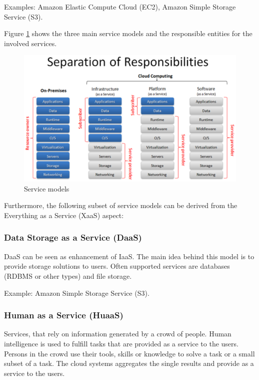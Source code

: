 Examples: Amazon Elastic Compute Cloud (EC2), Amazon Simple Storage Service (S3)\cite{trustedcloudcomputing}.

Figure \ref{fig:cloud_stack} shows the three main service models and the responsible entities for the involved services.

\begin{figure}[h]
	\centering
		\includegraphics{graphics/service_models.eps}
	\caption{Service models\cite{trustedcloudcomputing}}
	\label{fig:cloud_stack}
\end{figure}



Furthermore, the following subset of service models can be derived from the Everything as a Service (XaaS) aspect:

\subsubsection{Data Storage as a Service (DaaS)}
DaaS can be seen as enhancement of IaaS. The main idea behind this model is to provide storage solutions to users. Often supported services are databases (RDBMS or other types) and file storage.
		
Example: Amazon Simple Storage Service (S3)\cite{issues}.

\subsubsection{Human as a Service (HuaaS)}
Services, that rely on information generated by a crowd of people. Human intelligence is used to fulfill tasks that are provided as a service to the users. Persons in the crowd use their tools, skills or knowledge to solve a task or a small subset of a task. The cloud systems aggregates the single results and provide as a service to the users.
	
